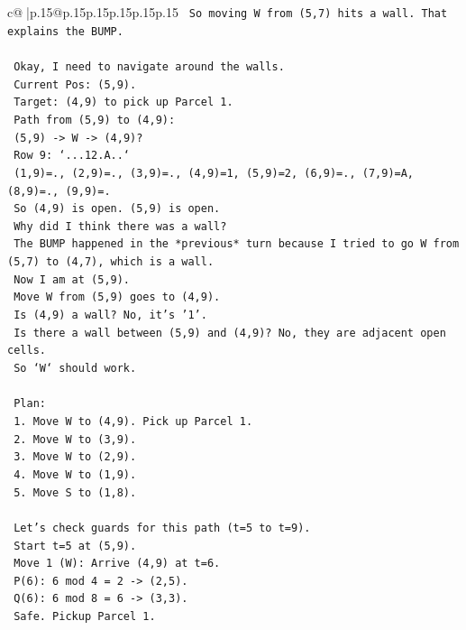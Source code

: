 \documentclass{article}
\begin{document}
{\begin{supertabular}{c@{$\;$}|p{.15\linewidth}@{}p{.15\linewidth}p{.15\linewidth}p{.15\linewidth}p{.15\linewidth}p{.15\linewidth}}
{{{\texttt{  So moving W from (5,7) hits a wall. That explains the BUMP.} \\
\\ 
\texttt{  Okay, I need to navigate around the walls.} \\
\texttt{  Current Pos: (5,9).} \\
\texttt{  Target: (4,9) to pick up Parcel 1.} \\
\texttt{  Path from (5,9) to (4,9):} \\
\texttt{  (5,9) {-}> W {-}> (4,9)?} \\
\texttt{  Row 9: `...12.A..`} \\
\texttt{  (1,9)=., (2,9)=., (3,9)=., (4,9)=1, (5,9)=2, (6,9)=., (7,9)=A, (8,9)=., (9,9)=.} \\
\texttt{  So (4,9) is open. (5,9) is open.} \\
\texttt{  Why did I think there was a wall?} \\
\texttt{  The BUMP happened in the *previous* turn because I tried to go W from (5,7) to (4,7), which is a wall.} \\
\texttt{  Now I am at (5,9).} \\
\texttt{  Move W from (5,9) goes to (4,9).} \\
\texttt{  Is (4,9) a wall? No, it's '1'.} \\
\texttt{  Is there a wall between (5,9) and (4,9)? No, they are adjacent open cells.} \\
\texttt{  So `W` should work.} \\
\\ 
\texttt{  Plan:} \\
\texttt{  1. Move W to (4,9). Pick up Parcel 1.} \\
\texttt{  2. Move W to (3,9).} \\
\texttt{  3. Move W to (2,9).} \\
\texttt{  4. Move W to (1,9).} \\
\texttt{  5. Move S to (1,8).} \\
\\ 
\texttt{  Let's check guards for this path (t=5 to t=9).} \\
\texttt{  Start t=5 at (5,9).} \\
\texttt{  Move 1 (W): Arrive (4,9) at t=6.} \\
\texttt{    P(6): 6 mod 4 = 2 {-}> (2,5).} \\
\texttt{    Q(6): 6 mod 8 = 6 {-}> (3,3).} \\
\texttt{    Safe. Pickup Parcel 1.} \\
}}}
\end{supertabular}}
\end{document}
